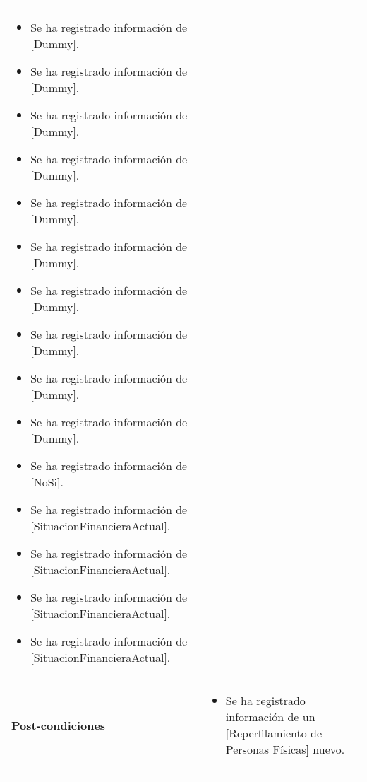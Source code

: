 \begin{tabular}{ p{3.5cm} p{11.5cm} }
\begin{minipage}[t]{0.6\textwidth}
\begin{itemize}[noitemsep,nolistsep]
				\item Se ha registrado informaci\'on de [Dummy].
				\item Se ha registrado informaci\'on de [Dummy].
				\item Se ha registrado informaci\'on de [Dummy].
				\item Se ha registrado informaci\'on de [Dummy].
				\item Se ha registrado informaci\'on de [Dummy].
				\item Se ha registrado informaci\'on de [Dummy].
				\item Se ha registrado informaci\'on de [Dummy].
				\item Se ha registrado informaci\'on de [Dummy].
				\item Se ha registrado informaci\'on de [Dummy].
				\item Se ha registrado informaci\'on de [Dummy].
				\item Se ha registrado informaci\'on de [NoSi].
				\item Se ha registrado informaci\'on de [SituacionFinancieraActual].
				\item Se ha registrado informaci\'on de [SituacionFinancieraActual].
				\item Se ha registrado informaci\'on de [SituacionFinancieraActual].
				\item Se ha registrado informaci\'on de [SituacionFinancieraActual].
			\end{itemize}
			\end{minipage} \\
		\textbf{Post-condiciones} &
			\begin{minipage}[t]{0.6\textwidth}
			\begin{itemize}[noitemsep,nolistsep]
			\setlength{\itemindent}{-.5cm}
				\item Se ha registrado informaci\'on de un [Reperfilamiento de Personas F\'isicas] nuevo.
			\end{itemize}
			\end{minipage} \\
		\\
	\end{tabular}
	
